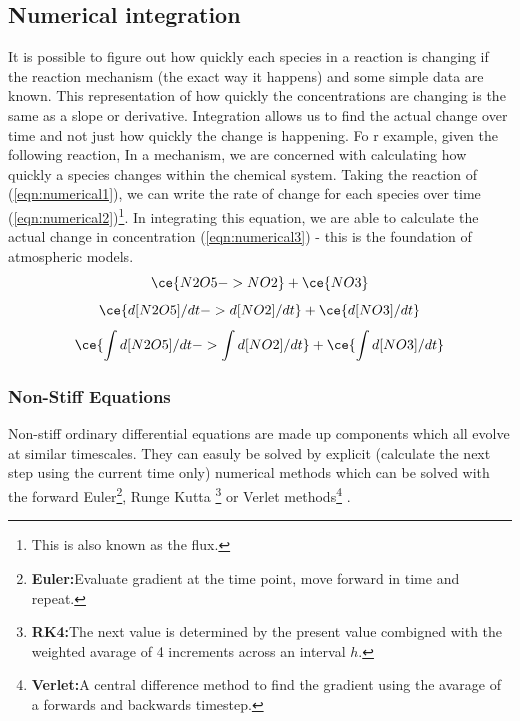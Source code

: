\subsection{Numerical integration}
It is possible to figure out how quickly each species in a reaction is changing if the reaction mechanism (the exact way it happens) and some simple data are known. This representation of how quickly the concentrations are changing is the same as a slope or derivative. Integration allows us to find the actual change over time and not just how quickly the change is happening. Fo r example, given the following reaction,
In a mechanism, we are concerned with calculating how quickly a species changes within the chemical system. Taking the reaction of  (\autoref{eqn:numerical1}), we can write the rate of change for each species over time (\autoref{eqn:numerical2})\footnote{This is also known as the flux.}. In integrating this equation, we are able to calculate the actual change in concentration (\autoref{eqn:numerical3}) - this is the foundation of atmospheric models.
\begin{equation}
\ce{N2O5 ->    NO2} + \ce{NO3}
\label{eqn:numerical1}
\end{equation}
\begin{equation}
\ce{ d[N2O5]/dt ->    d[NO2]/dt} + \ce{d[NO3]/dt}
\label{eqn:numerical2}
\end{equation}
\begin{equation}
\ce{ \int d[N2O5]/dt ->    \int d[NO2]/dt} + \ce{\int d[NO3]/dt}
\label{eqn:numerical3}
\end{equation}
\subsubsection{Non-Stiff Equations}
Non-stiff ordinary differential equations are made up components which all evolve at similar timescales. They can easuly be solved by explicit (calculate the next step using the current time only) numerical methods which can be solved with the forward Euler\footnote{\textbf{Euler:}Evaluate gradient at the time point, move forward in time and repeat.}, Runge Kutta \footnote{\textbf{RK4:}The next value is determined by the present value combigned with the weighted avarage of 4 increments across an interval $h$.} or Verlet methods\footnote{\textbf{Verlet:}A central difference method to find the gradient using the avarage of a forwards and backwards timestep.} \citep{advnummeth,wild}.   


% 
